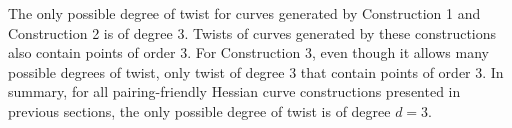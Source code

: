 The only possible degree of twist for curves generated by Construction 1 and Construction 2 is of degree $3$.
Twists of curves generated by these constructions also contain points of order 3.
For Construction 3, even though it allows many possible degrees of twist,
only twist of degree $3$ that contain points of order 3.
In summary,
for all pairing-friendly Hessian curve constructions presented in previous sections,
the only possible degree of twist is of degree $d = 3$.

